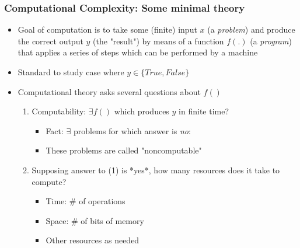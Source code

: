 \documentclass[bigger]{beamer}
\begin{document}
\begin{frame}%

\frametitle{Computational Complexity: Some minimal theory}

\begin{itemize}

\item Goal of computation is to take some (finite) input $x$ (a \emph{problem}) and produce the correct output $y$ (the "result") by means of a function $f(.)$ (a \emph{program}) that applies a series of steps which can be performed by a machine
\item Standard to study case where $y\in\{True,False\}$
\item Computational theory asks several questions about $f()$

\begin{enumerate}
\item Computability: $\exists f()$ which produces $y$ in finite time?
  \begin{itemize}
  \item Fact: $\exists$ problems for which answer is \emph{no}:
  \item These problems are called "noncomputable"
  \end{itemize}
\item Supposing answer to (1) is *yes*, how many resources does it take to compute?
  \begin{itemize}
  \item Time: $\#$ of operations
  \item Space: $\#$ of bits of memory
  \item Other resources as needed
  \end{itemize}
\end{enumerate}

\end{itemize}

\end{frame}%
\end{document}
